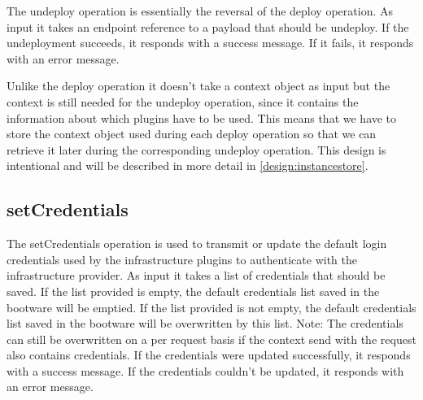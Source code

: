 The undeploy operation is essentially the reversal of the deploy operation.
As input it takes an endpoint reference to a payload that should be undeploy.
If the undeployment succeeds, it responds with a success message.
If it fails, it responds with an error message.

Unlike the deploy operation it doesn't take a context object as input but the context is still needed for the undeploy operation, since it contains the information about which plugins have to be used.
This means that we have to store the context object used during each deploy operation so that we can retrieve it later during the corresponding undeploy operation.
This design is intentional and will be described in more detail in \autoref{design:instancestore}.

\subsection{setCredentials}

The setCredentials operation is used to transmit or update the default login credentials used by the infrastructure plugins to authenticate with the infrastructure provider.
As input it takes a list of credentials that should be saved.
If the list provided is empty, the default credentials list saved in the bootware will be emptied.
If the list provided is not empty, the default credentials list saved in the bootware will be overwritten by this list.
Note: The credentials can still be overwritten on a per request basis if the context send with the request also contains credentials.
If the credentials were updated successfully, it responds with a success message.
If the credentials couldn't be updated, it responds with an error message.
